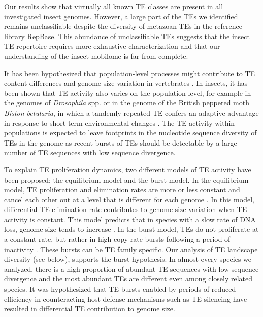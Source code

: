 Our results show that virtually all known TE classes are present in all
investigated insect genomes.  However, a large part of the TEs we
identified remains unclassifiable despite the diversity of metazoan TEs
in the reference library RepBase.  This abundance of unclassifiable TEs
suggests that the insect TE repertoire requires more exhaustive
characterization and that our understanding of the insect mobilome is
far from complete.

It has been hypothesized that population-level processes might
contribute to TE content differences and genome size variation in
vertebrates \citep{Lynch2003}.  In insects, it has been shown that TE
activity also varies on the population level, for example in the genomes
of \emph{Drosophila} spp.  \citep{Perrat2013,Li2013,Blumenstiel2014} or
in the genome of the British peppered moth \emph{Biston betularia}, in
which a tandemly repeated TE confers an adaptive advantage in response
to short-term environmental changes \citep{Hof2016}. The TE activity
within populations is expected to leave footprints in the nucleotide
sequence diversity of TEs in the genome as recent bursts of TEs should
be detectable by a large number of TE sequences with low sequence
divergence.

To explain TE proliferation dynamics, two different models of TE
activity have been proposed: the equilibrium model and the burst model.
In the equilibrium model, TE proliferation and elimination rates are
more or less constant and cancel each other out at a level that is
different for each genome \citep{Charlesworth1983}. In this model,
differential TE elimination rate contributes to genome size variation
when TE activity is constant. This model predicts that in species with a
slow rate of DNA loss, genome size tends to increase
\citep{Petrov2011,Sun2011}.  In the burst model, TEs do not proliferate
at a constant rate, but rather in high copy rate bursts following a
period of inactivity \citep{Blumenstiel2014}. These bursts can be TE
family specific. Our analysis of TE landscape diversity (see below),
supports the burst hypothesis. In almost every species we analyzed,
there is a high proportion of abundant TE sequences with low sequence
divergence and the most abundant TEs are different even among closely
related species. It was hypothesized that TE bursts enabled by periods
of reduced efficiency in counteracting host defense mechanisms such as
TE silencing \citep{LeRouzic2006,Rebollo2010} have resulted in
differential TE contribution to genome size.

